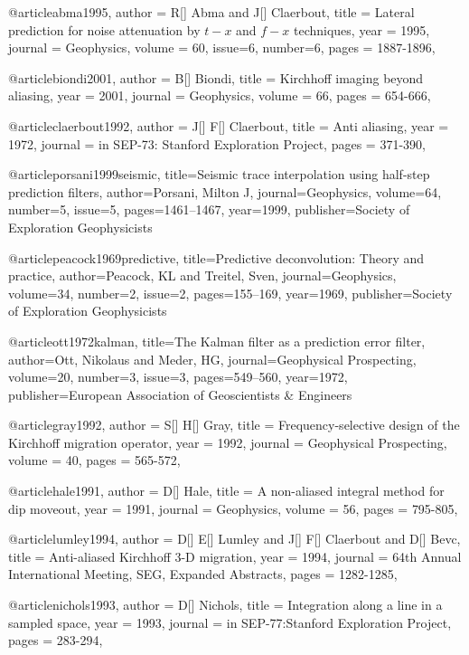 @article{abma1995,
  author =	 {R[] Abma and J[] Claerbout},
  title =	 {Lateral prediction for noise attenuation by $t-x$ and $f-x$ techniques},
  year =	 1995,
  journal =	 {Geophysics},
  volume =	 60,
  issue=6,
  number=6,
  pages =	 {1887-1896},
}

@article{biondi2001,
  author =	 {B[] Biondi},
  title =	 {Kirchhoff imaging beyond aliasing},
  year =	 2001,
  journal =	 {Geophysics},
  volume =	 66,
  pages =	 {654-666},
}

@article{claerbout1992,
  author =	 {J[] F[] Claerbout},
  title =	 {Anti aliasing},
  year =	 1972,
  journal =	 {in SEP-73: Stanford Exploration Project},
  pages =	 {371-390},
}

@article{porsani1999seismic,
  title={Seismic trace interpolation using half-step prediction filters},
  author={Porsani, Milton J},
  journal={Geophysics},
  volume={64},
  number={5},
  issue=5,
  pages={1461--1467},
  year={1999},
  publisher={Society of Exploration Geophysicists}
}

@article{peacock1969predictive,
  title={Predictive deconvolution: Theory and practice},
  author={Peacock, KL and Treitel, Sven},
  journal={Geophysics},
  volume={34},
  number={2},
  issue=2,
  pages={155--169},
  year={1969},
  publisher={Society of Exploration Geophysicists}
}


@article{ott1972kalman,
  title={The Kalman filter as a prediction error filter},
  author={Ott, Nikolaus and Meder, HG},
  journal={Geophysical Prospecting},
  volume={20},
  number={3},
  issue=3,
  pages={549--560},
  year={1972},
  publisher={European Association of Geoscientists \& Engineers}
}

@article{gray1992,
  author =	 {S[] H[] Gray},
  title =	 {Frequency-selective design of the Kirchhoff migration operator},
  year =	 1992,
  journal =	 {Geophysical Prospecting},
  volume =	 40,
  pages =	 {565-572},
}

@article{hale1991,
  author =	 {D[] Hale},
  title =	 {A non-aliased integral method for dip moveout},
  year =	 1991,
  journal =	 {Geophysics},
  volume =	 56,
  pages =	 {795-805},
}

@article{lumley1994,
  author =	 {D[] E[] Lumley and J[] F[] Claerbout and D[] Bevc},
  title =	 {Anti-aliased Kirchhoff 3-D migration},
  year =	 1994,
  journal =	 {64th Annual International Meeting, SEG, Expanded Abstracts},
  pages =	 {1282-1285},
}

@article{nichols1993,
  author =	 {D[] Nichols},
  title =	 {Integration along a line in a sampled space},
  year =	 1993,
  journal =	 {in SEP-77:Stanford Exploration Project},
  pages =	 {283-294},
}

